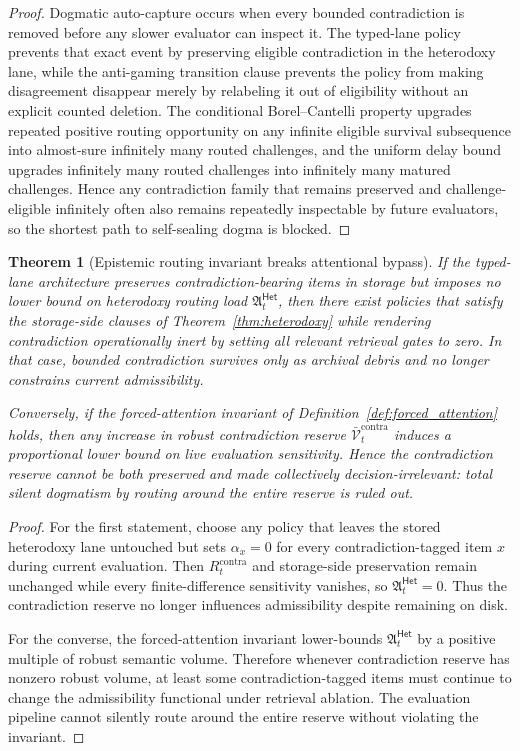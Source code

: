 \documentclass[11pt]{article}
\newtheorem{theorem}{Theorem}[section]
\theoremstyle{definition}
\newcommand{\1}{\mathbf{1}}
\newcommand{\Het}{\mathsf{Het}}
\begin{document}
\begin{proof}
Dogmatic auto-capture occurs when every bounded contradiction is removed before any slower evaluator can inspect it. The typed-lane policy prevents that exact event by preserving eligible contradiction in the heterodoxy lane, while the anti-gaming transition clause prevents the policy from making disagreement disappear merely by relabeling it out of eligibility without an explicit counted deletion. The conditional Borel--Cantelli property upgrades repeated positive routing opportunity on any infinite eligible survival subsequence into almost-sure infinitely many routed challenges, and the uniform delay bound upgrades infinitely many routed challenges into infinitely many matured challenges. Hence any contradiction family that remains preserved and challenge-eligible infinitely often also remains repeatedly inspectable by future evaluators, so the shortest path to self-sealing dogma is blocked.
\end{proof}


\begin{theorem}[Epistemic routing invariant breaks attentional bypass]\label{thm:forced_attention}
If the typed-lane architecture preserves contradiction-bearing items in storage but imposes no lower bound on heterodoxy routing load $\mathfrak A_t^{\Het}$, then there exist policies that satisfy the storage-side clauses of Theorem~\ref{thm:heterodoxy} while rendering contradiction operationally inert by setting all relevant retrieval gates to zero. In that case, bounded contradiction survives only as archival debris and no longer constrains current admissibility.

Conversely, if the forced-attention invariant of Definition~\ref{def:forced_attention} holds, then any increase in robust contradiction reserve $\bar{\mathcal V}_t^{\mathrm{contra}}$ induces a proportional lower bound on live evaluation sensitivity. Hence the contradiction reserve cannot be both preserved and made collectively decision-irrelevant: total silent dogmatism by routing around the entire reserve is ruled out.
\end{theorem}

\begin{proof}
For the first statement, choose any policy that leaves the stored heterodoxy lane untouched but sets $\alpha_x=0$ for every contradiction-tagged item $x$ during current evaluation. Then $R_t^{\mathrm{contra}}$ and storage-side preservation remain unchanged while every finite-difference sensitivity vanishes, so $\mathfrak A_t^{\Het}=0$. Thus the contradiction reserve no longer influences admissibility despite remaining on disk.

For the converse, the forced-attention invariant lower-bounds $\mathfrak A_t^{\Het}$ by a positive multiple of robust semantic volume. Therefore whenever contradiction reserve has nonzero robust volume, at least some contradiction-tagged items must continue to change the admissibility functional under retrieval ablation. The evaluation pipeline cannot silently route around the entire reserve without violating the invariant.
\end{proof}
\end{document}
